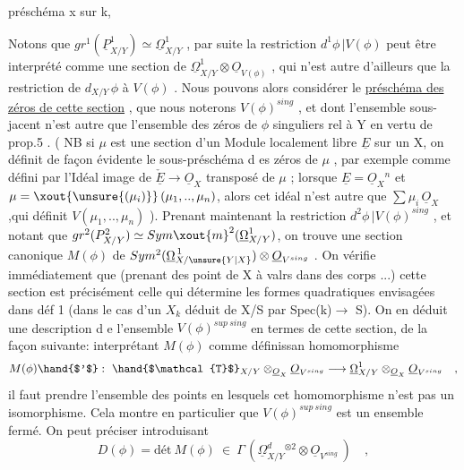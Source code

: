 
préschéma x sur k, 

Notons que $gr^1(\underline{P}^1_{X/Y}) \simeq \underline{\Omega}^1_{X/Y}$ , par suite la restriction
$d^1\phi\,|V(\phi)$ peut être interprété comme une section de $\underline{\Omega}^1_{X/Y} \otimes \underline{O}_{V(\phi)}$ ,
qui n'est autre d'ailleurs que la restriction de $d_{X/Y}\,\phi$ à $V(\phi)$ . Nous
pouvons alors considérer le \uline{préschéma des zéros de cette section} , que
nous noterons $V(\phi)^{sing}$ , et dont l'ensemble sous-jacent n'est autre
que l'ensemble des zéros de $\phi$ singuliers rel à Y en vertu de prop.5 .
( NB si \xout{\unsure{$\phi$}} $\mu$ est une section d'un Module localement libre  $\underline{E}$ sur un
\margin{$\|$}  X, on définit de façon évidente le sous-préschéma d es
zéros de $\mu$ , par exemple comme défini par l'Idéal image de $\check{\underline{E}} \longrightarrow \underline{O}_X$
transposé de $\mu$ ; lorsque $\underline{E} = \underline{O}_X{}^n$ et $\mu = \xout{\unsure{(\mu_i)}}\,(\mu_1,..,\mu_n)$, alors cet
idéal n'est autre que $\sum \mu_i\,\underline{O}_X$ ,qui définit $V(\mu_1,..,\mu_n)$ ). Prenant
maintenant la restriction $d^2\phi\,|V(\phi)^{sing}$ , et notant que
$gr^2(P^2_{X/Y}) \simeq Sym\xout{m}^2(\underline{\Omega}^1_{X/Y})$, on trouve une section canonique $M(\phi)$ de
$Sym^2(\underline{\Omega}^{\,1}_{X/\unsure{Y|X}}) \otimes \underline{O}_{V^{sing}}$ . On vérifie immédiatement que (prenant des
\margin{$\|$}point de X à valrs dans des corps ...) cette section est précisément
celle qui détermine les formes quadratiques envisagées dans déf 1
(dans le cas  d'un $X_k$ déduit de X/S par Spec(k)$\rightarrow$ S). On
en déduit une description d e l'ensemble $V(\phi)^{sup\ sing}$ en termes de
cette section, de la façon suivante: interprétant $M(\phi)$ comme définissan
homomorphisme
\[
M(\phi)\hand{$'$} : \ \hand{$\mathcal{T}$}_{X/Y} \otimes_{\underline{O}_X} \underline{O}_{V^{sing}} \longrightarrow \underline{\Omega}^1_{X/Y} \otimes_{\underline{O}_X} \underline{O}_{V^{sing}} \quad ,
\]
il faut prendre l'ensemble des points en lesquels cet homomorphisme
n'est pas un isomorphisme. Cela montre en particulier que $V(\phi)^{sup\ sing}$
est un ensemble fermé. On peut  préciser  introduisant
\[
D(\phi) = \text{dét}\ M(\phi) \ \in \ \Gamma\,(\underline{\Omega}^d_{X/Y}{}^{\otimes 2} \otimes \underline{O}_{V^{sing}}\ ) \quad ,
\]

